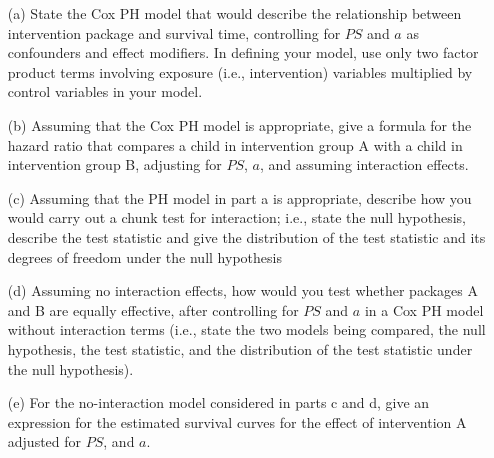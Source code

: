 \documentclass[12pt]{article}
\begin{document}
\begin{itemize}
	\item[(a)] State the Cox PH model that would describe the relationship between intervention package and survival time, controlling for $PS$ and $a$ as confounders and effect modifiers. In defining your model, use only two factor product terms involving exposure (i.e., intervention) variables multiplied by control variables in your model.

	\item[(b)] Assuming that the Cox PH model is appropriate, give a formula for the hazard ratio that compares a child in intervention group A with a child in intervention group B, adjusting for $PS$, $a$, and assuming interaction effects.
	
	\item[(c)] Assuming that the PH model in part a is appropriate, describe how you would carry out a chunk test for interaction; i.e., state the null hypothesis, describe the test statistic and give the distribution of the test statistic and its degrees of freedom under the null hypothesis

	\item[(d)] Assuming no interaction effects, how would you test whether packages A and B are equally effective, after controlling for $PS$ and $a$ in a Cox PH model without interaction terms (i.e., state the two models being compared, the null hypothesis, the test statistic, and the distribution of the test statistic under the null hypothesis).
	
	\item[(e)] For the no-interaction model considered in parts c and d, give an expression for the estimated survival curves for the effect of intervention A adjusted for $PS$, and $a$.
\end{itemize}
\end{document}

